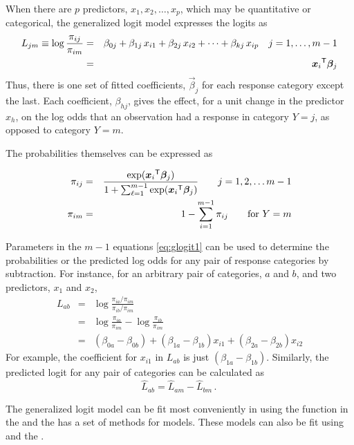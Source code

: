 \documentclass[11pt]{book}\usepackage[]{graphicx}\usepackage[]{color}
\begin{document}
When there are $p$ predictors, \(x_1, x_2, \dots , x_p\),
which may be quantitative or categorical, the generalized logit
model expresses the logits as
\begin{eqnarray}\label{eq:glogit1}
  L_{jm}  \equiv
    \log \frac{\pi_{ij}}{\pi_{im}} & = & \beta_{0j}  +
  \beta _{1j} \,  x_{i1}  +
  \beta _{2j} \,  x_{i2}  + \cdots +
  \beta _{kj} \,  x_{ip} \quad
   j=1, \dots , m-1 \nonumber \\
  & = & {\bm{x}_i} ^\mathsf{T} \bm{\beta}_j
\end{eqnarray}
Thus, there is one set of fitted coefficients, $\vec{\beta}_j$ for each
response category except the last.
Each coefficient, $\beta_{hj}$, gives the effect,
for a unit change in the predictor $x_h$,
on the log odds
that an observation had a response in 
category $Y=j$, as opposed to category $Y=m$.

The probabilities themselves can be expressed as

\begin{eqnarray*}
 \pi_{ij} & = &
 \frac{ \exp ( {\bm{x}_i} ^\mathsf{T} \bm{\beta}_j ) }
      {1 + \sum_{\ell=1}^{m-1} \exp ( {\bm{x}_i} ^\mathsf{T} \bm{\beta}_j ) }
      \quad\quad j=1, 2, \dots m-1
 \\
 \pi_{im} & = & 1 - \sum_{i=1}^{m-1} \pi_{ij} \quad\quad\mbox{for } Y=m
\end{eqnarray*}

Parameters in the $m-1$ equations \eqref{eq:glogit1} can be used to determine the
probabilities or the predicted log odds for any pair of response categories
by subtraction.
For instance, for an arbitrary pair of categories, $a$ and $b$,
and two predictors, $x_1$ and $x_2$,
\begin{eqnarray*}%
  L_{ab} & = & \log \frac{\pi_{ia}/\pi_{im}}{\pi_{ib}/\pi_{im}} \\
         & = & \log \frac{\pi_{ia}}{\pi_{im}} - \log \frac{\pi_{ib}}{\pi_{im}} \\
         & = & (\beta_{0a}-\beta_{0b}) + (\beta_{1a}-\beta_{1b}) x_{i1}
            + (\beta_{2a}-\beta_{2b}) x_{i2} 
\end{eqnarray*}
For example, the coefficient for $x_{i1}$ in $ L_{ab}$
is just $(\beta_{1a}-\beta_{1b})$.
Similarly, the predicted logit for any pair of categories
can be calculated as
\begin{equation*}
 \hat{L}_{ab} = \hat{L}_{am} - \hat{L}_{bm}
 \period
\end{equation*}

The generalized logit model can be fit most conveniently
in \R using the 
function  in the  and the
 has a set of methods for 
models.  These models can also be fit using 
and the .
\end{document}

